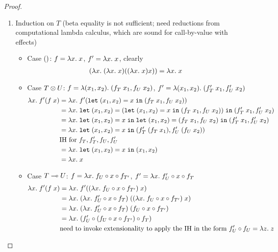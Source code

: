 \begin{proof}
  \begin{enumerate}
  \item Induction on $T$ (beta equality is not sufficient; need
    reductions from computational lambda calculus, which are sound for
    call-by-value with effects)
    \begin{itemize}
    \item Case $()$: $f = \lambda x.\; x$, $f' = \lambda x.\; x$, clearly
      \begin{align*}
        (\lambda x.\; (\lambda x.\; x) ((\lambda x.\; x) x)) &= \lambda x.\; x
      \end{align*}
    \item Case $T \otimes U$: $f = \lambda (x_1,x_2).\; (f_T \; x_1, f_U \;
      x_2)$, $f' = \lambda (x_1,x_2).\; (f'_T \; x_1, f'_U \; x_2)$
      \begin{align*}
        \lambda x.\; f' (f\; x)
        &= \lambda x.\; f' (\mathtt{let}\; (x_1,x_2) = x \;\mathtt{in}\; (f_T \; x_1, f_U \; x_2)) \\
        &= \lambda x.\; \mathtt{let}\; (x_1,x_2) =  (\mathtt{let}\; (x_1,x_2) = x \;\mathtt{in}\; (f_T \; x_1,
          f_U \; x_2)) \;\mathtt{in}\;  (f'_T \; x_1, f'_U \; x_2)\\
        &= \lambda x.\;
          \mathtt{let}\; (x_1,x_2) = x \;\mathtt{in}\; \mathtt{let}\; (x_1,x_2) =  (f_T \; x_1,
          f_U \; x_2) \;\mathtt{in}\;  (f'_T \; x_1, f'_U \; x_2)\\
        &= \lambda x.\;
          \mathtt{let}\; (x_1,x_2) = x \;\mathtt{in}\;  (f'_T \; (f_T\; x_1), f'_U \; (f_U\;
          x_2))\\
        & \text{IH for }f_T, f_T', f_U, f_U' \\
        &= \lambda x.\;
          \mathtt{let}\; (x_1,x_2) = x \;\mathtt{in}\;  (x_1,x_2)\\
        &= \lambda x.\; x
      \end{align*}
    \item Case $T \multimap U$: $f = \lambda x.\; f_U \circ x \circ f_{T'}$, $f'
      = \lambda x.\; f'_U \circ x \circ f_T$
      \begin{align*}
        \ELam x f' (f\; x)
        &= \ELam x f' ((\ELam x f_U \circ x \circ f_{T'})\; x) \\
        &= \ELam x (\ELam x f'_U \circ x \circ f_T)\; ((\ELam x f_U \circ x \circ f_{T'})\; x) \\
        &= \ELam x (\ELam x f'_U \circ x \circ f_T)\; (f_U \circ x \circ f_{T'}) \\
        &= \ELam x (f'_U \circ (f_U \circ x \circ f_{T'})
          \circ f_T) \\
        & \text{need to invoke extensionality to apply the IH in the
          form } f'_U \circ f_U = \ELam z z  \\

\end{align*}
\end{itemize}
\end{enumerate}
\end{proof}
